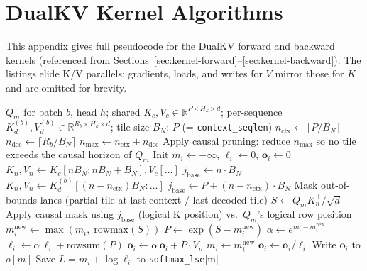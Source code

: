 \documentclass{article}
\begin{document}
\section{DualKV Kernel Algorithms}
\label{app:kernel-algorithms}

This appendix gives full pseudocode for the DualKV forward and backward kernels (referenced from Sections~\ref{sec:kernel-forward}--\ref{sec:kernel-backward}). The listings elide K/V parallels: gradients, loads, and writes for $V$ mirror those for $K$ and are omitted for brevity.

\begin{algorithm}[H]
\small
\caption{DualKV forward kernel (one thread block, assigned $(m, b, h)$ = query-row block, batch, head)}
\label{alg:dualkv-forward}
\begin{algorithmic}[1]
\Require $Q_m$ for batch $b$, head $h$; shared $K_c, V_c \in \mathbb{R}^{P \times H_k \times d}$; per-sequence $K_d^{(b)}, V_d^{(b)} \in \mathbb{R}^{R_b \times H_k \times d}$; tile size $B_N$; $P$ (= \texttt{context\_seqlen})
\State $n_{\text{ctx}} \gets \lceil P / B_N \rceil$
\State $n_{\text{dec}} \gets \lceil R_b / B_N \rceil$
\State $n_{\max} \gets n_{\text{ctx}} + n_{\text{dec}}$
\State Apply causal pruning: reduce $n_{\max}$ so no tile exceeds the causal horizon of $Q_m$
\State Init $m_i \gets -\infty$,\; $\ell_i \gets 0$,\; $\mathbf{o}_i \gets 0$ 
 
     
        \State $K_n, V_n \gets K_c[n B_N : n B_N + B_N], V_c[\ldots]$
        \State $j_{\text{base}} \gets n \cdot B_N$ 
    \Else {}
        \State $K_n, V_n \gets K_d^{(b)}[(n{-}n_{\text{ctx}}) B_N : \ldots]$
        \State $j_{\text{base}} \gets P + (n - n_{\text{ctx}}) \cdot B_N$
    \EndIf
    \State Mask out-of-bounds lanes (partial tile at last context / last decoded tile)
    \State $S \gets Q_m K_n^\top / \sqrt{d}$
    \State Apply causal mask using $j_{\text{base}}$ (logical K position) vs.\ $Q_m$'s logical row position
    \State $m_i^{\text{new}} \gets \max(m_i,\; \text{rowmax}(S))$
    \State $P \gets \exp(S - m_i^{\text{new}})$
    \State $\alpha \gets e^{m_i - m_i^{\text{new}}}$ 
    \State $\ell_i \gets \alpha \, \ell_i + \text{rowsum}(P)$
    \State $\mathbf{o}_i \gets \alpha \, \mathbf{o}_i + P \cdot V_n$
    \State $m_i \gets m_i^{\text{new}}$
\EndFor
\State $\mathbf{o}_i \gets \mathbf{o}_i / \ell_i$ 
\State Write $\mathbf{o}_i$ to $o[m]$
\State Save $L = m_i + \log \ell_i$ to \texttt{softmax\_lse}[m] 
\end{algorithmic}
\end{algorithm}
\end{document}
